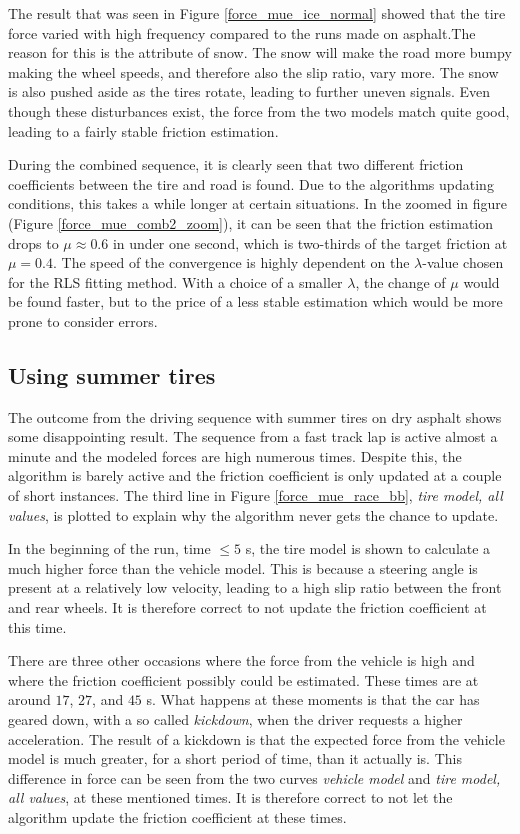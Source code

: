 The result that was seen in Figure \ref{force_mue_ice_normal} showed that the tire force varied with high frequency compared to the runs made on asphalt.The reason for this is the attribute of snow. The snow will make the road more bumpy making the wheel speeds, and therefore also the slip ratio, vary more. The snow is also pushed aside as the tires rotate, leading to further uneven signals. Even though these disturbances exist, the force from the two models match quite good, leading to a fairly stable friction estimation. 

During the combined sequence, it is clearly seen that two different friction coefficients between the tire and road is found. Due to the algorithms updating conditions, this takes a while longer at certain situations. In the zoomed in figure (Figure \ref{force_mue_comb2_zoom}), it can be seen that the friction estimation drops to $ \mu \approx 0.6 $ in under one second, which is two-thirds of the target friction at $ \mu = 0.4 $. The speed of the convergence is highly dependent on the $ \lambda $-value chosen for the RLS fitting method. With a choice of a smaller $ \lambda $, the change of $ \mu $ would be found faster, but to the price of a less stable estimation which would be more prone to consider errors. 

\subsection{Using summer tires}
The outcome from the driving sequence with summer tires on dry asphalt shows some disappointing result. The sequence from a fast track lap is active almost a minute and the modeled forces are high numerous times. Despite this, the algorithm is barely active and the friction coefficient is only updated at a couple of short instances. The third line in Figure \ref{force_mue_race_bb}, \textit{tire model, all values}, is plotted to explain why the algorithm never gets the chance to update.

In the beginning of the run, time $ \leq 5 $ s, the tire model is shown to calculate a much higher force than the vehicle model. This is because a steering angle is present at a relatively low velocity, leading to a high slip ratio between the front and rear wheels. It is therefore correct to not update the friction coefficient at this time. 

There are three other occasions where the force from the vehicle is high and where the friction coefficient possibly could be estimated. These times are at around $ 17 $, $ 27 $, and $ 45 $ s. What happens at these moments is that the car has geared down, with a so called \textit{kickdown}, when the driver requests a higher acceleration. The result of a kickdown is that the expected force from the vehicle model is much greater, for a short period of time, than it actually is. This difference in force can be seen from the two curves \textit{vehicle model} and \textit{tire model, all values}, at these mentioned times. It is therefore correct to not let the algorithm update the friction coefficient at these times.

